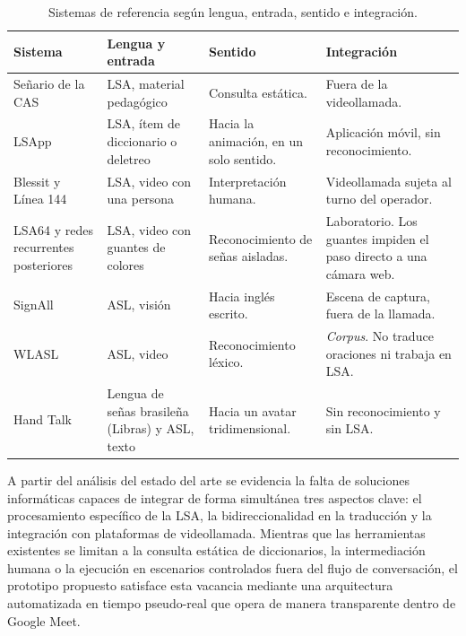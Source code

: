 \begin{table}[H]
    \centering
    \small
    \caption{Sistemas de referencia según lengua, entrada, sentido e integración.}
    \label{tab:estado_arte}
    \begin{tabularx}{\textwidth}{@{}>{\raggedright\arraybackslash}p{}
                                 >{\raggedright\arraybackslash}p{}
                                 >{\raggedright\arraybackslash}X
                                 >{\raggedright\arraybackslash}p{}@{}}
        \toprule
        \textbf{Sistema} & \textbf{Lengua y entrada} & \textbf{Sentido} & \textbf{Integración} \\
        \midrule
        Señario de la CAS \parencite{cas2024senario} & LSA, material pedagógico & Consulta estática. & Fuera de la videollamada. \\
        \addlinespace[2pt]
        LSApp \parencite{lsapp2018} & LSA, ítem de diccionario o deletreo & Hacia la animación, en un solo sentido. & Aplicación móvil, sin reconocimiento. \\
        \addlinespace[2pt]
        Blessit y Línea 144 \parencite{blessit2024interpretes, argentina2024linea144} & LSA, video con una persona & Interpretación humana. & Videollamada sujeta al turno del operador. \\
        \addlinespace[2pt]
        LSA64 y redes recurrentes posteriores \parencite{ronchetti2016lsa64, mindlin2021reconocimiento} & LSA, video con guantes de colores & Reconocimiento de señas aisladas. & Laboratorio. Los guantes impiden el paso directo a una cámara web. \\
        \addlinespace[2pt]
        SignAll \parencite{retek2023signall} & ASL, visión & Hacia inglés escrito. & Escena de captura, fuera de la llamada. \\
        \addlinespace[2pt]
        WLASL \parencite{li2020wlasl} & ASL, video & Reconocimiento léxico. & \textit{Corpus}. No traduce oraciones ni trabaja en LSA. \\
        \addlinespace[2pt]
        Hand Talk \parencite{handtalk2025} & Lengua de señas brasileña (Libras) y ASL, texto & Hacia un avatar tridimensional. & Sin reconocimiento y sin LSA. \\
        \bottomrule
    \end{tabularx}
\end{table}

A partir del análisis del estado del arte se evidencia la falta de soluciones informáticas capaces de integrar de forma simultánea tres aspectos clave: el procesamiento específico de la LSA, la bidireccionalidad en la traducción y la integración con plataformas de videollamada. Mientras que las herramientas existentes se limitan a la consulta estática de diccionarios, la intermediación humana o la ejecución en escenarios controlados fuera del flujo de conversación, el prototipo propuesto satisface esta vacancia mediante una arquitectura automatizada en tiempo pseudo-real que opera de manera transparente dentro de Google Meet.

